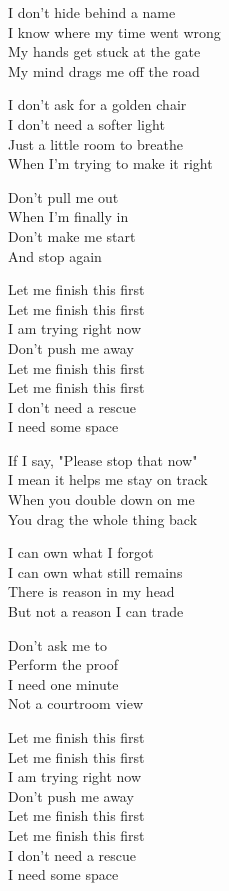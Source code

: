 \begin{lyrics}
I don't hide behind a name\\
I know where my time went wrong\\
My hands get stuck at the gate\\
My mind drags me off the road

I don't ask for a golden chair\\
I don't need a softer light\\
Just a little room to breathe\\
When I'm trying to make it right

Don't pull me out\\
When I'm finally in\\
Don't make me start\\
And stop again

Let me finish this first\\
Let me finish this first\\
I am trying right now\\
Don't push me away\\
Let me finish this first\\
Let me finish this first\\
I don't need a rescue\\
I need some space

If I say, "Please stop that now"\\
I mean it helps me stay on track\\
When you double down on me\\
You drag the whole thing back

I can own what I forgot\\
I can own what still remains\\
There is reason in my head\\
But not a reason I can trade

Don't ask me to\\
Perform the proof\\
I need one minute\\
Not a courtroom view

Let me finish this first\\
Let me finish this first\\
I am trying right now\\
Don't push me away\\
Let me finish this first\\
Let me finish this first\\
I don't need a rescue\\
I need some space


\end{lyrics}
